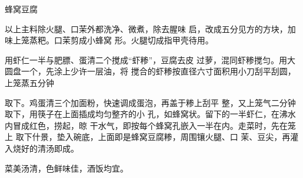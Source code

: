 \begin{recipe}{蜂窝豆腐}

\ingredients


\cooking

\step 	以上主料除火腿、口茉外都洗净、微煮，除去腥味 启，改成五分见方的方块，加味上笼蒸粑。口茉剪成小蜂窝 形。火腿切成指甲壳待用。

\step 	用虾仁一半与肥膘、蛋清二个搅成“虾糁”，豆腐去皮 过萝，混同虾糁搅匀。用大圆盘一个，先涂上少许一层油，将 搅合的虾糁按直径六寸面积用小刀刮平刮圆，上笼蒸五分钟

取下。鸡蛋清三个加面粉，快速调成蛋泡，再盖于糁上刮平 整，又上笼气二分钟取下，用筷子在上面插成均匀整齐的小 孔，如蜂窝状。留下的一半虾仁，在沸水内冒成红色，捞起，晾 干水气，即按每个蜂窝孔嵌入一半在内。走菜时，先在笼上 取下什景，垫入碗底，上面即是蜂窝豆腐糁，周围镶火腿、口 茉、豆尖，再灌入烧好的清汤即成。

\notes

菜美汤清，色鲜味佳，酒饭均宜。

\end{recipe}

